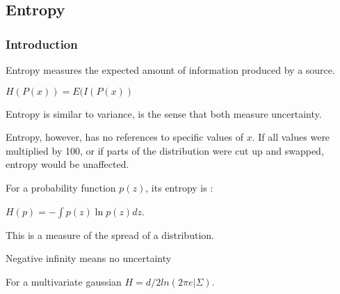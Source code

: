 
\subsection{Entropy}

\subsubsection{Introduction}

Entropy measures the expected amount of information produced by a source.

\(H(P(x))=E(I(P(x))\)

Entropy is similar to variance, is the sense that both measure uncertainty.

Entropy, however, has no references to specific values of \(x\). If all values were multiplied by 100, or if parts of the distribution were cut up and swapped, entropy would be unaffected.

For a probability function \(p(z)\), its entropy is :

\(H(p)=-\int p(z)\ln p(z)dz\).

This is a measure of the spread of a distribution.

Negative infinity means no uncertainty

For a multivariate gaussian \(H=d/2 ln(2\pi e|\Sigma)\).

